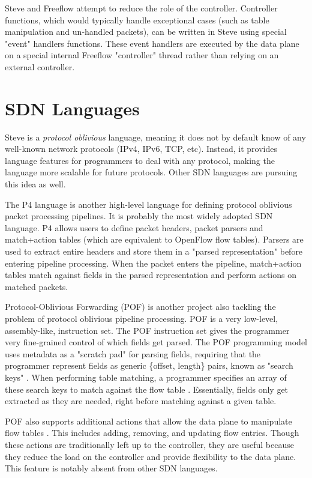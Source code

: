 Steve and Freeflow attempt to reduce the role of the controller. Controller
functions, which would typically handle exceptional cases (such as table
manipulation and un-handled packets), can be written in Steve using special
"event" handlers functions. These event handlers are executed by the data plane
on a special internal Freeflow "controller" thread rather than relying on an
external controller. 

\section{SDN Languages} \label{rel:p4}

Steve is a \textit{protocol oblivious} language, meaning it does not by default
know of any well-known network protocols (IPv4, IPv6, TCP, etc). Instead, it
provides language features for programmers to deal with any protocol, making the
language more scalable for future protocols. Other SDN languages are pursuing
this idea as well.

The P4 language \cite{p4_spec, p4_spec2} is another high-level language for
defining protocol oblivious packet processing pipelines. It is probably the
most widely adopted SDN language. P4 allows users to define packet headers,
packet parsers and
match+action tables (which are equivalent to OpenFlow flow tables). Parsers are
used to extract entire headers and store them in a "parsed representation"
before entering pipeline processing. When the packet enters the pipeline,
match+action tables match against fields in the parsed representation and
perform actions on matched packets. 

Protocol-Oblivious Forwarding (POF) \cite{pof_fis, pof, pof_impl} is another
project also tackling the problem of protocol oblivious pipeline processing. POF
is a very low-level, assembly-like, instruction set. The POF instruction
set gives the programmer very fine-grained control of which fields get parsed.
The POF programming model uses metadata as a "scratch pad" for parsing fields,
requiring that the
programmer represent fields as generic \{offset, length\} pairs, known as
"search keys" \cite{pof}. When performing table matching, a programmer specifies
an array of these search keys to match against the flow table \cite{pof_impl}.
Essentially, fields only get extracted as they are needed, right before matching
against a given table.

POF also supports additional actions that allow the data plane to manipulate
flow tables \cite{pof}. This includes adding, removing, and updating flow
entries. Though these actions are traditionally left up to the controller, they
are useful because they reduce the load on the controller and provide
flexibility to the data plane. This feature is notably absent from other SDN
languages.

